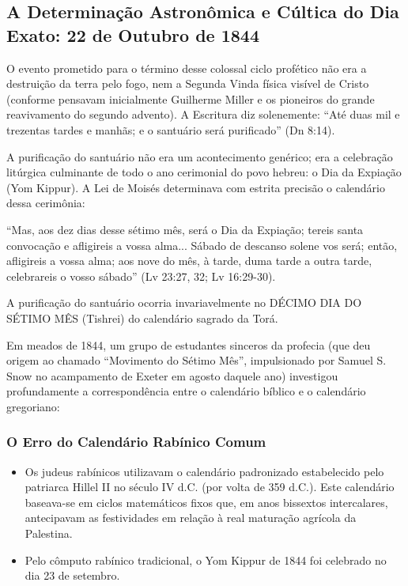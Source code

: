 \documentclass[11pt,a4paper,openany]{book}
\begin{document}
\subsection{A Determinação Astronômica e Cúltica do Dia Exato: 22 de Outubro de 1844}


O evento prometido para o término desse colossal ciclo profético não era a destruição da terra pelo fogo, nem a Segunda Vinda física visível de Cristo (conforme pensavam inicialmente Guilherme Miller e os pioneiros do grande reavivamento do segundo advento). A Escritura diz solenemente: ``Até duas mil e trezentas tardes e manhãs; e o santuário será purificado'' (Dn 8:14).

A purificação do santuário não era um acontecimento genérico; era a celebração litúrgica culminante de todo o ano cerimonial do povo hebreu: o Dia da Expiação (Yom Kippur). A Lei de Moisés determinava com estrita precisão o calendário dessa cerimônia:

``Mas, aos dez dias desse sétimo mês, será o Dia da Expiação; tereis santa convocação e afligireis a vossa alma... Sábado de descanso solene vos será; então, afligireis a vossa alma; aos nove do mês, à tarde, duma tarde a outra tarde, celebrareis o vosso sábado'' (Lv 23:27, 32; Lv 16:29-30).

A purificação do santuário ocorria invariavelmente no DÉCIMO DIA DO SÉTIMO MÊS (Tishrei) do calendário sagrado da Torá.

Em meados de 1844, um grupo de estudantes sinceros da profecia (que deu origem ao chamado ``Movimento do Sétimo Mês'', impulsionado por Samuel S. Snow no acampamento de Exeter em agosto daquele ano) investigou profundamente a correspondência entre o calendário bíblico e o calendário gregoriano:

\subsubsection*{O Erro do Calendário Rabínico Comum}
\begin{itemize}
  \item Os judeus rabínicos utilizavam o calendário padronizado estabelecido pelo patriarca Hillel II no século IV d.C. (por volta de 359 d.C.). Este calendário baseava-se em ciclos matemáticos fixos que, em anos bissextos intercalares, antecipavam as festividades em relação à real maturação agrícola da Palestina.
  \item Pelo cômputo rabínico tradicional, o Yom Kippur de 1844 foi celebrado no dia 23 de setembro.
\end{itemize}
\end{document}
